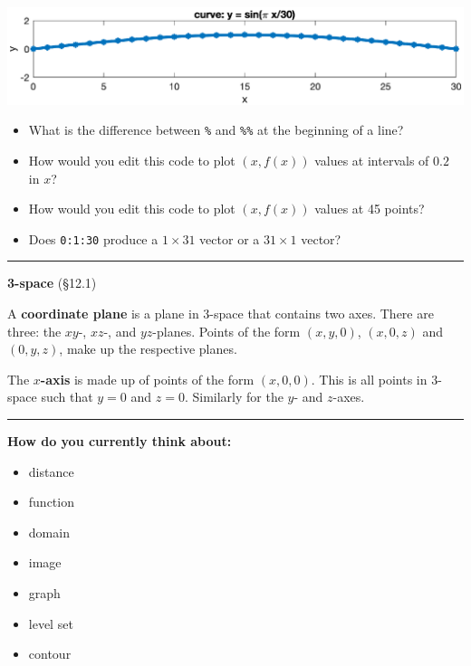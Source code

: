 \documentclass[12pt,letterpaper,noanswers]{exam}
\begin{document}
\includegraphics[width=\textwidth]{img/sinewave2.eps}

\begin{itemize}
    \item What is the difference between \texttt{\%} and \texttt{\%\%} at the beginning of a line?
    \vspace{1cm}
    
    \item How would you edit this code to plot $(x,f(x))$ values at intervals of $0.2$ in $x$?
    \vspace{0.6cm}
    
    \item How would you edit this code to plot $(x,f(x))$ values at 45 points?
    \vspace{0.6cm}
    
    \item Does \texttt{0:1:30} produce a $1\times 31$ vector or a $31 \times 1$ vector?
     \vspace{0.6cm}
     
\end{itemize}

\vspace{0.2cm}
\hrule
\vspace{0.2cm}

\eject

\noindent\textbf{3-space} (\S 12.1)
\begin{tcolorbox}
A \textbf{coordinate plane} is a plane in $3$-space that contains two axes.  There are three: the $xy$-, $xz$-, and $yz$-planes.  Points of the form $(x,y,0)$, $(x,0,z)$ and $(0,y,z)$, make up the respective planes.

The \textbf{$x$-axis} is made up of points of the form $(x,0,0)$.  This is all points in $3$-space such that $y=0$ and $z=0$.  Similarly for the $y$- and $z$-axes.
\end{tcolorbox}

\vspace{0.2cm}
\hrule
\vspace{0.2cm}

\noindent\textbf{How do you currently think about:}
\begin{itemize}
\itemsep0em
    \item distance
    \item function
    \item domain
    \item image
    \item graph
    \item level set
    \item contour
\end{itemize}
\end{document}
